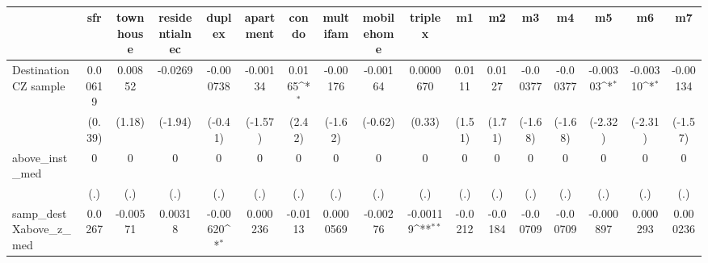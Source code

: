 \begin{table}[htbp]\centering
\def\sym#1{\ifmmode^{#1}\else\(^{#1}\)\fi}
\caption{ \label{tab1}}
\begin{tabular}{l*{16}{c}}
\toprule
                    &\multicolumn{1}{c}{sfr}&\multicolumn{1}{c}{townhouse}&\multicolumn{1}{c}{residentialnec}&\multicolumn{1}{c}{duplex}&\multicolumn{1}{c}{apartment}&\multicolumn{1}{c}{condo}&\multicolumn{1}{c}{multifam}&\multicolumn{1}{c}{mobilehome}&\multicolumn{1}{c}{triplex}&\multicolumn{1}{c}{m1}&\multicolumn{1}{c}{m2}&\multicolumn{1}{c}{m3}&\multicolumn{1}{c}{m4}&\multicolumn{1}{c}{m5}&\multicolumn{1}{c}{m6}&\multicolumn{1}{c}{m7}\\
\midrule
Destination CZ sample&     0.00619         &     0.00852         &     -0.0269         &   -0.000738         &    -0.00134         &      0.0165\sym{*}  &    -0.00176         &    -0.00164         &   0.0000670         &      0.0111         &      0.0127         &    -0.00377         &    -0.00377         &    -0.00303\sym{*}  &    -0.00310\sym{*}  &    -0.00134         \\
                    &      (0.39)         &      (1.18)         &     (-1.94)         &     (-0.41)         &     (-1.57)         &      (2.42)         &     (-1.62)         &     (-0.62)         &      (0.33)         &      (1.51)         &      (1.71)         &     (-1.68)         &     (-1.68)         &     (-2.32)         &     (-2.31)         &     (-1.57)         \\
\addlinespace
above\_inst\_med      &           0         &           0         &           0         &           0         &           0         &           0         &           0         &           0         &           0         &           0         &           0         &           0         &           0         &           0         &           0         &           0         \\
                    &         (.)         &         (.)         &         (.)         &         (.)         &         (.)         &         (.)         &         (.)         &         (.)         &         (.)         &         (.)         &         (.)         &         (.)         &         (.)         &         (.)         &         (.)         &         (.)         \\
\addlinespace
samp\_destXabove\_z\_med&      0.0267         &    -0.00571         &     0.00318         &    -0.00620\sym{*}  &    0.000236         &     -0.0113         &   0.0000569         &    -0.00276         &    -0.00119\sym{**} &     -0.0212         &     -0.0184         &    -0.00709         &    -0.00709         &   -0.000897         &    0.000293         &    0.000236         \\

\end{tabular}
\end{table}

